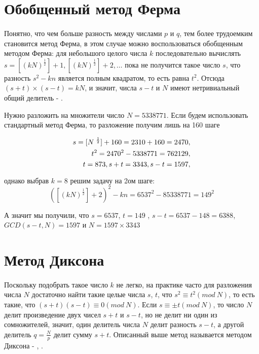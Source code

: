 \section{Обобщенный метод Ферма}

  \paragraph{} Понятно, что чем больше разность между числами $p$ и $q$, тем более трудоемким становится метод Ферма, в этом случае 
  можно воспользоваться обобщенным методом Ферма: для небольшого целого числа $k$ последовательно вычислять 
  $s = [(kN)^{ \frac{1}{2}}] + 1, [(kN)^{ \frac{1}{2}}] + 2, \dots$ пока не получится такое число $s$, 
  что разность $s^{2} - kn$ является полным квадратом, то есть равна $t^{2}$. Отсюда
  $(s + t)\times(s - t) = kN$, и значит, числа $s - t$ и $N$ имеют нетривиальный общий делитель - 
  \cite[Глава 2.1, страницы 51-53]{ish11}.
  
  \begin{example}
    Нужно разложить на множители число $N = 5338771$. Если будем использовать стандартный метод Ферма, то разложение получим лишь на 160 шаге
    
      \begin{subequations}
	\begin{align}
	  s = [N\textsuperscript{ {$\frac{1}{2}$}}] + 160 = 2310 + 160 = 2470, \\
	  t\textsuperscript{2} = 2470\textsuperscript{2} - 5338771 = 762129, \\
	  t = 873, s + t = 3343, s - t = 1597, 
       \end{align}
      \end{subequations}	
    
    однако выбрав $k = 8$ решим задачу на 2ом шаге: 
      \begin{equation}
       ([(kN)^{ \frac{1}{2}}] + 2)^{2} - k n = 6537^{2} - 8 5338771 = 149^{2}
      \end{equation}	
	
    А значит мы получили, что $s = 6537$, $t = 149$ , $s - t = 6537 - 148 = 6388$, $GCD(s - t, N) = 1597$ и $N = 1597 \times 3343$
  \end{example}


\section{Метод Диксона}

\paragraph{} Поскольку подобрать такое число $k$ не легко, на практике часто для разложения числа $N$ достаточно найти такие целые числа $s$,
$t$, что $s^{2} \equiv t^{2}(mod \: N)$, то есть такие, что $(s + t)(s - t) \equiv 0 (mod \: N)$. 
Если $s \equiv \pm t(mod \: N)$, то число $N$ делит произведение двух чисел $s + t$ и $s - t$, но не делит ни один 
из сомножителей, значит, один делитель числа $N$ делит разность $s - t$, а другой делитель $q = \frac{N}{p}$ делит сумму $s + t$.
Описанный выше метод называется методом Диксона - \cite[Глава 4.1, страницы 115-117]{ish11}, \cite[Глава 6.4, страницы 218-219]{mah06}.

